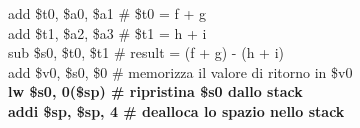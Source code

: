 \documentclass[../main.tex]{subfiles}
\begin{document}
{{    }
    \hspace*{0cm} \hspace*{0cm} \hspace*{0cm} \hspace*{0cm} add \$t0, \$a0, \$a1 \hspace*{0cm} \# \$t0 = f + g \\
    \hspace*{0cm} \hspace*{0cm} \hspace*{0cm} \hspace*{0cm} add \$t1, \$a2, \$a3 \hspace*{0cm} \# \$t1 = h + i \\
    \hspace*{0cm} \hspace*{0cm} \hspace*{0cm} \hspace*{0cm} sub \$s0, \$t0, \$t1 \hspace*{0cm} \# result = (f + g) - (h + i) \\
    \hspace*{0cm} \hspace*{0cm} \hspace*{0cm} \hspace*{0cm} add \$v0, \$s0, \$0 \hspace*{0cm} \hspace*{0cm} \# memorizza il valore di ritorno in \$v0 \\
    \textbf{
        \hspace*{0cm} \hspace*{0cm} \hspace*{0cm} \hspace*{0cm} lw \$s0, 0(\$sp) \hspace*{0cm} \hspace*{0cm} \hspace*{0cm} \hspace*{0cm} \# ripristina \$s0 dallo stack \\
    \hspace*{0cm} \hspace*{0cm} \hspace*{0cm} \hspace*{0cm} addi \$sp, \$sp, 4 \hspace*{0cm} \hspace*{0cm} \# dealloca lo spazio nello stack \\
    }
}
\end{document}
